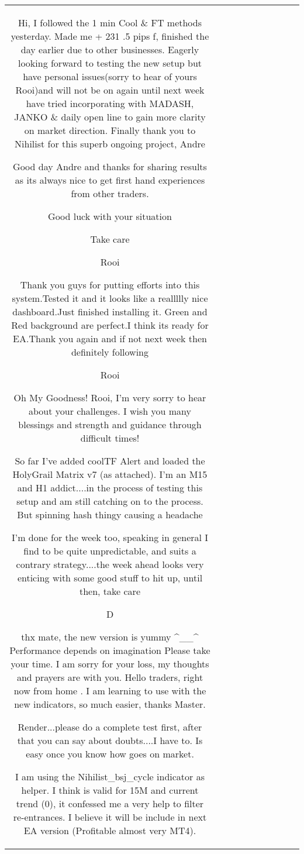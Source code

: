 \begin{table}[h!]
\begin{tabular}{|c|c|c|c|c|c|c|c|c|c|}
Hi, I followed the 1 min Cool \& FT methods yesterday. Made me + 231 .5 pips f, finished the day earlier due to other businesses. Eagerly looking forward to testing the new setup but have personal issues(sorry to hear of yours Rooi)and will not be on again until next week
have tried incorporating with MADASH, JANKO \& daily open line to gain more clarity on market direction.
Finally thank you to Nihilist for this superb ongoing project,
Andre

Good day Andre and thanks for sharing results as its always nice to get first hand experiences from other traders.

Good luck with your situation

Take care

Rooi

Thank you guys for putting efforts into this system.Tested it and it looks like a reallllly nice dashboard.Just finished installing it. Green and Red background are perfect.I think its ready for EA.Thank you again and if not next week then definitely following



Rooi


Oh My Goodness!
Rooi, I'm very sorry to hear about your challenges. I wish you many blessings and strength and guidance through difficult times!

So far I've added coolTF Alert and loaded the HolyGrail Matrix v7 (as attached). I'm an M15 and H1 addict....in the process of testing this setup and am still catching on to the process. But spinning hash thingy causing a headache 

I'm done for the week too, speaking in general I find to be quite unpredictable, and suits a contrary strategy....the week ahead looks very enticing with some good stuff to hit up, until then, take care

D

thx mate, the new version is yummy ^__^
Performance depends on imagination
Please take your time. I am sorry for your loss, my thoughts and prayers are with you.
Hello traders, right now from home . 
I am learning to use with the new indicators, so much easier, thanks Master.

Render...please do a complete test first, after that you can say about doubts....I have to. Is easy once you know how goes on market.

I am using the Nihilist_bsj_cycle indicator as helper. I think is valid for 15M and current trend (0), it confessed me a very help to filter re-entrances. I believe it will be include in next EA version (Profitable almost very MT4).


\end{tabular}
\end{table}
